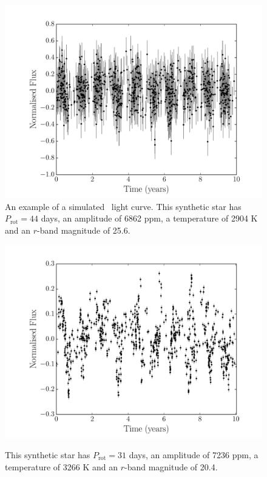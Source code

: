 \begin{figure}
\begin{center}
\includegraphics[width=6in, clip=true]{figures/0000.pdf}
\caption[Example simulated \LSST\ light curve 1.]
{An example of a simulated \LSST\ light curve.
This synthetic star has $P_{\mathrm{rot}} = 44$ days, an amplitude of 6862
ppm, a temperature of 2904 K and an $r$-band magnitude of 25.6.}
\label{fig:demo1}
\end{center}
\end{figure}

\begin{figure}
\begin{center}
\includegraphics[width=6in, clip=true]{figures/0003.pdf}
\caption[Example simulated \LSST\ light curve 2.]
{This synthetic star has $P_{\mathrm{rot}} = 31$ days, an amplitude of 7236
ppm, a temperature of 3266 K and an $r$-band magnitude of 20.4.}
\citet{}
\label{fig:demo2}
\end{center}
\end{figure}

